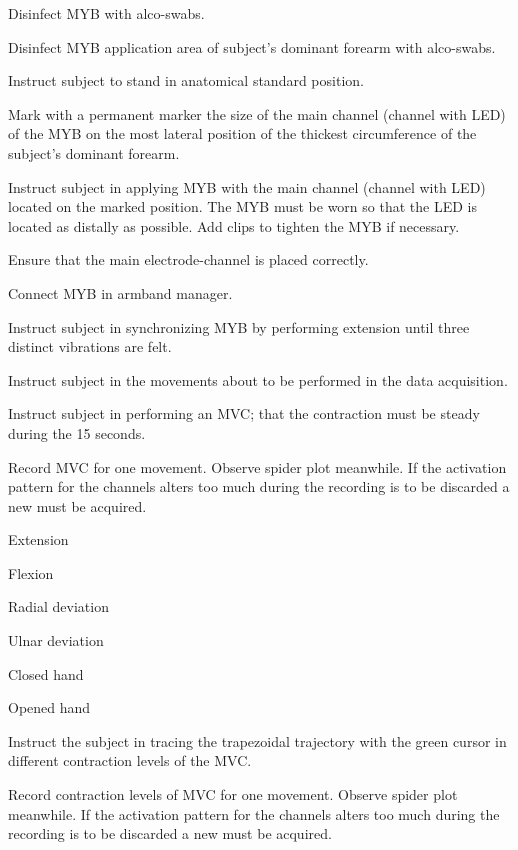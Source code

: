\begin{todolist}
	\item Disinfect MYB with alco-swabs.
	\item Disinfect MYB application area of subject's dominant forearm with alco-swabs.
	\item Instruct subject to stand in anatomical standard position.
	\item Mark with a permanent marker the size of the main channel (channel with LED) of the MYB on the most lateral position of the thickest circumference of the subject's dominant forearm.
	\item Instruct subject in applying MYB with the main channel (channel with LED) located on the marked position. The MYB must be worn so that the LED is located as distally as possible. Add clips to tighten the MYB if necessary.
	\item Ensure that the main electrode-channel is placed correctly.
	\item Connect MYB in armband manager.
	\item Instruct subject in synchronizing MYB by performing extension until three distinct vibrations are felt. 
	\item Instruct subject in the movements about to be performed in the data acquisition.
	\item Instruct subject in performing an MVC; that the contraction must be steady during the 15 seconds.
	\item Record MVC for one movement. Observe spider plot meanwhile. If the activation pattern for the channels alters too much during the recording is to be discarded a new must be acquired.
	\begin{todolist}
		\item Extension
		\item Flexion
		\item Radial deviation
		\item Ulnar deviation
		\item Closed hand
		\item Opened hand
	\end{todolist}
	\item Instruct the subject in tracing the trapezoidal trajectory with the green cursor in different contraction levels of the MVC.
	\item Record contraction levels of MVC for one movement. Observe spider plot meanwhile. If the activation pattern for the channels alters too much during the recording is to be discarded a new must be acquired.

\end{todolist}
